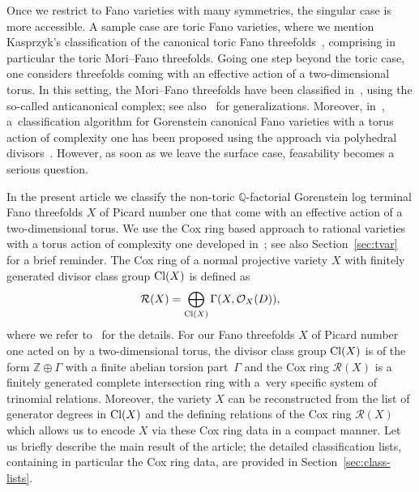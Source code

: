 \documentclass[pdftex]{sigma}%
\theoremstyle{definition}
\def\Cl{{\rm Cl}}
\def\ZZ{{\mathbb Z}}
\def\QQ{{\mathbb Q}}
\numberwithin{equation}{section}
\begin{document}
Once we restrict to Fano varieties with many symmetries,
the singular case is more accessible.
A sample case are toric Fano varieties, where we mention
Kasprzyk's classification of the canonical toric Fano
threefolds~\cite{Ka}, comprising in particular
the toric Mori--Fano threefolds.
Going one step beyond the toric case, one
considers threefolds coming with an effective action
of a two-dimensional torus.
In this setting, the Mori--Fano threefolds have
been classified in~\cite{BeHaHuNi},
using the so-called anticanonical complex; see
also~\cite{HiWr} for generalizations.
Moreover, in~\cite{Il}, a~classification algorithm
for Gorenstein canonical Fano varieties with a torus
action of complexity one has been proposed using
the approach via polyhedral divisors~\cite{AlHa}.
However, as soon as we leave the surface case,
feasability becomes a serious question.


In the present article we classify the non-toric $\QQ$-factorial
Gorenstein log terminal Fano threefolds $X$ of Picard
number one that come with an effective action of a
two-dimensional torus.
We use the Cox ring based approach to rational
varieties with a torus action of complexity one developed
in~\cite{HaHe, HaSu}; see also
Section~\ref{sec:tvar} for a brief reminder.
The Cox ring of a normal projective variety $X$
with finitely generated divisor class group $\Cl(X)$
is defined as
\[
\mathcal{R}(X)
 =
\bigoplus_{\Cl(X)} \Gamma(X,\mathcal{O}_X(D)),
\]
where we refer to~\cite{ArDeHaLa} for the details.
For our Fano threefolds $X$ of Picard number one
acted on by a two-dimensional torus,
the divisor class group $\Cl(X)$ is of the form
$\ZZ \oplus \Gamma$ with a finite abelian torsion
part~$\Gamma$ and the Cox ring $\mathcal{R}(X)$ is a finitely
generated complete intersection ring with a~very
specific system of trinomial relations.
Moreover, the variety $X$ can be reconstructed
from the list of generator degrees in $\Cl(X)$
and the defining relations of the Cox ring
$\mathcal{R}(X)$ which allows us to encode $X$
via these Cox ring data in a compact manner.
Let us briefly describe the main result of the
article; the detailed classification lists, containing
in particular the Cox ring data,
are provided in Section~\ref{sec:class-lists}.
\end{document}
